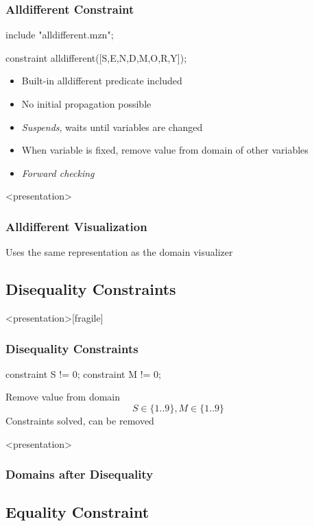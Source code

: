 \begin{frame}[fragile]
\frametitle{Alldifferent Constraint}
\begin{semiverbatim}
include "alldifferent.mzn";

constraint alldifferent([S,E,N,D,M,O,R,Y]);
\end{semiverbatim}
\begin{itemize}
\item Built-in alldifferent predicate included
\item No initial propagation possible
\item {\em Suspends}, waits until variables are changed
\item When variable is fixed, remove value from domain of other variables
\item {\em Forward checking}
\end{itemize}
\end{frame}

\begin{frame}<presentation>
\frametitle{Alldifferent Visualization}
Uses the same representation as the domain visualizer
\begin{center}

\end{center}
\end{frame}


\subsection{Disequality Constraints}


\begin{frame}<presentation>[fragile]
\frametitle{Disequality Constraints}
\begin{semiverbatim}
constraint S != 0;
constraint M != 0;
\end{semiverbatim}
Remove value from domain
\[
S \in \{1..9\}, M \in \{1..9\}
\]
Constraints solved, can be removed 
\end{frame}


\begin{frame}<presentation>
\frametitle{Domains after Disequality}
\begin{center}

\end{center}
\end{frame}


\subsection{Equality Constraint}


